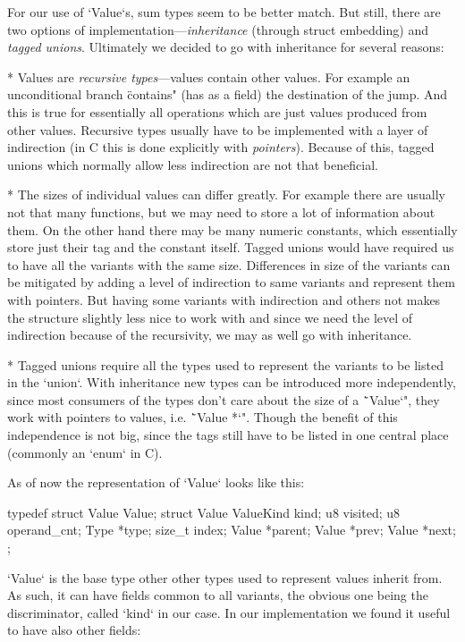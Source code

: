 For our use of `Value`s, sum types seem to be better match. But still, there are
two options of implementation---{\em inheritance} (through struct embedding) and
{\em tagged unions}. Ultimately we decided to go with inheritance for several
reasons:

\begitems
* Values are {\em recursive types}---values contain other values. For example an
unconditional branch \"contains" (has as a field) the destination of the jump.
And this is true for essentially all operations which are just values produced
from other values. Recursive types usually have to be implemented with a layer
of indirection (in C this is done explicitly with {\em pointers}). Because of
this, tagged unions which normally allow less indirection are not that
beneficial.

* The sizes of individual values can differ greatly. For example there are
usually not that many functions, but we may need to store a lot of information
about them. On the other hand there may be many numeric constants, which
essentially store just their tag and the constant itself. Tagged unions would
have required us to have all the variants with the same size. Differences in size of
the variants can be mitigated by adding a level of indirection to same variants
and represent them with pointers. But having some variants with indirection and
others not makes the structure slightly less nice to work with and since we need
the level of indirection because of the recursivity, we may as well go with
inheritance.

* Tagged unions require all the types used to represent the variants to be
listed in the `union`. With inheritance new types can be introduced more
independently, since most consumers of the types don't care about the size of
a \"`Value`", they work with pointers to values, i.e. \"`Value *`". Though the
benefit of this independence is not big, since the tags still have to be listed
in one central place (commonly an `enum` in C).
\enditems

As of now the representation of `Value` looks like this:

\begtt
typedef struct Value Value;
struct Value {
	ValueKind kind;
	u8 visited;
	u8 operand_cnt;
	Type *type;
	size_t index;
	Value *parent;
	Value *prev;
	Value *next;
};
\endtt

`Value` is the base type other other types used to represent values inherit
from. As such, it can have fields common to all variants, the obvious one being
the discriminator, called `kind` in our case. In our implementation
we found it useful to have also other fields:

